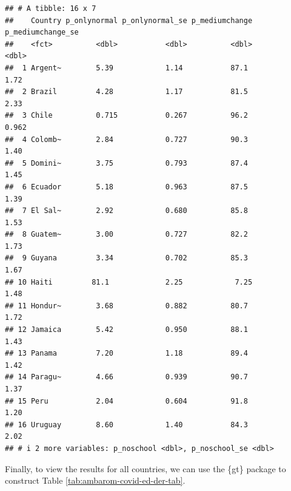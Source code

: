 \documentclass[
]{krantz}
\begin{document}
\begin{verbatim}
## # A tibble: 16 x 7
##    Country p_onlynormal p_onlynormal_se p_mediumchange p_mediumchange_se
##    <fct>          <dbl>           <dbl>          <dbl>             <dbl>
##  1 Argent~        5.39            1.14           87.1              1.72 
##  2 Brazil         4.28            1.17           81.5              2.33 
##  3 Chile          0.715           0.267          96.2              0.962
##  4 Colomb~        2.84            0.727          90.3              1.40 
##  5 Domini~        3.75            0.793          87.4              1.45 
##  6 Ecuador        5.18            0.963          87.5              1.39 
##  7 El Sal~        2.92            0.680          85.8              1.53 
##  8 Guatem~        3.00            0.727          82.2              1.73 
##  9 Guyana         3.34            0.702          85.3              1.67 
## 10 Haiti         81.1             2.25            7.25             1.48 
## 11 Hondur~        3.68            0.882          80.7              1.72 
## 12 Jamaica        5.42            0.950          88.1              1.43 
## 13 Panama         7.20            1.18           89.4              1.42 
## 14 Paragu~        4.66            0.939          90.7              1.37 
## 15 Peru           2.04            0.604          91.8              1.20 
## 16 Uruguay        8.60            1.40           84.3              2.02 
## # i 2 more variables: p_noschool <dbl>, p_noschool_se <dbl>
\end{verbatim}

Finally, to view the results for all countries, we can use the \{gt\} package to construct Table \ref{tab:ambarom-covid-ed-der-tab}.
\end{document}
